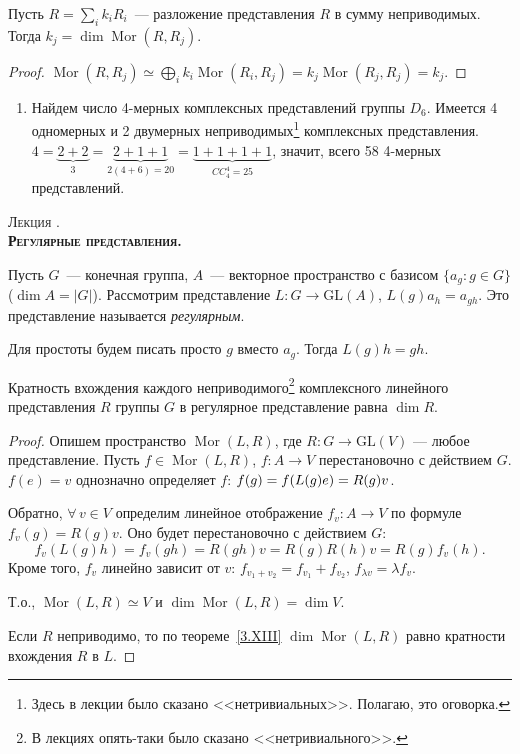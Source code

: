 \documentclass[a4paper]{article}
\newcounter{lec}
\renewcommand{\thelec}{\Roman{lec}}
\newcommand*{\lecture}[1]{\refstepcounter{lec}\vspace{20pt}
\begin{center}{\rmfamily\textsc{Лекция \thelec. \\ \textbf{#1}}}\vspace{5pt}
\end{center}}
\newcommand{\Mor}{\mathop{\mathrm{Mor}}\nolimits}
\newcommand*{\p}[1]{#1\nobreak\discretionary{}{\hbox{$\mathsurround=0pt #1$}}{}}
\begin{document}
\begin{imp}
Пусть $R=\sum\limits_i k_iR_i$~--- разложение представления $R$ в
сумму неприводимых. Тогда $k_j=\dim\Mor(R,R_j)$.
\end{imp}

\begin{proof}
$\Mor(R,R_j)\simeq \bigoplus\limits_ik_i\Mor(R_i,
R_j)=k_j\Mor(R_j,R_j)=k_j$.
\end{proof}

\begin{ex}
\begin{enumerate}
  \item Найдем число 4-мерных комплексных представлений группы
  $D_6$. Имеется 4 одномерных и 2 двумерных неприводимых\footnote{Здесь
  в лекции было сказано <<нетривиальных>>. Полагаю, это оговорка.} комплексных
  представления. $4=\underbrace{2+2}_{3}=\underbrace{2+1+1}_{2(4+6)=20}=
  \underbrace{1+1+1+1}_{CC^4_4=25}$, значит, всего 58 4-мерных
  представлений.
\end{enumerate}
\end{ex}
\lecture{Регулярные представления.}

Пусть $G$~--- конечная группа, $A$~--- векторное пространство с
базисом $\{a_g: g\in G\}$ ($\dim A=|G|$). Рассмотрим представление
$L\colon G\to \mathrm{GL}(A)$, $L(g)a_h=a_{gh}$. Это представление
называется \emph{регулярным}.

Для простоты будем писать просто $g$ вместо $a_g$. Тогда $L(g)h=gh$.

\begin{theorem}
Кратность вхождения каждого неприводимого\footnote{В лекциях
опять-таки было сказано <<нетривиального>>.} комплексного линейного
представления $R$ группы $G$ в регулярное представление равна $\dim
R$.
\end{theorem}

\begin{proof}
Опишем пространство $\Mor(L, R)$, где $R\colon G\to \mathrm{GL}(V)$
--- любое представление. Пусть $f\in \Mor(L,R)$, $f\colon A\to V$
перестановочно с действием $G$. $f(e)=v$ однозначно определяет $f$:
$f(g)=f(L(g)e)\p=R(g)v$.

Обратно, $\forall \, v\in V$ определим линейное отображение
$f_v\colon A\to V$ по формуле $f_v(g)=R(g)v$. Оно будет
перестановочно с действием $G$:
$$f_v(L(g)h)=f_v(gh)=R(gh)v=R(g)R(h)v=R(g)f_v(h).$$ Кроме того,
$f_v$ линейно зависит от $v$: $f_{v_1+v_2}=f_{v_1}+f_{v_2}$,
$f_{\lambda v}=\lambda f_v$.

Т.о., $\Mor(L,R)\simeq V$ и $\dim \Mor(L,R)=\dim V$.

Если $R$ неприводимо, то по теореме~\ref{3.XIII} $\dim \Mor(L,R)$
равно кратности вхождения $R$ в $L$.
\end{proof}
\end{document}
